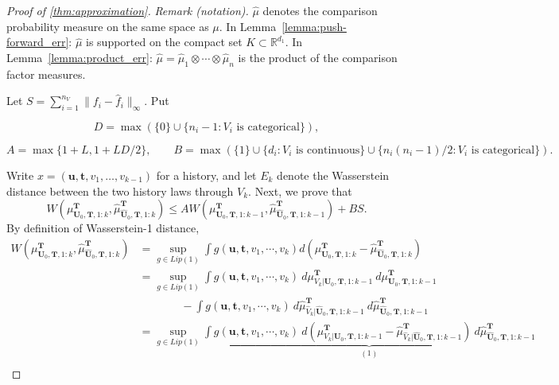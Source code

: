 \begin{proof}[Proof of \cref{thm:approximation}]
\noindent\textit{Remark (notation).} $\hat{\mu}$ denotes the comparison probability measure on the same space as $\mu$. In Lemma~\ref{lemma:push-forward_err}: $\hat{\mu}$ is supported on the compact set $K\subset\mathbb{R}^{d_1}$. In Lemma~\ref{lemma:product_err}: $\hat{\mu}=\hat{\mu}_1\otimes\cdots\otimes\hat{\mu}_n$ is the product of the comparison factor measures.

Let $S=\sum_{i=1}^{n_V}\|f_i-\hat f_i\|_\infty$. Put

\[
D=\max\left(\{0\}\cup\{n_i-1:V_i\text{ is categorical}\}\right),
\]

\[
A=\max\{1+L,1+LD/2\},\qquad
B=\max\left(\{1\}\cup\{d_i:V_i\text{ is continuous}\}\cup\{n_i(n_i-1)/2:V_i\text{ is categorical}\}\right).
\]

Write $x=(\boldsymbol u,\boldsymbol t,v_1,\ldots,v_{k-1})$ for a history, and let $E_k$ denote the Wasserstein distance between the two history laws through $V_k$. Next, we prove that
\begin{equation}\label{eq:approximation_middle_step}
W\left(\mu_{\boldsymbol U_0,\boldsymbol T,1:k}^{\boldsymbol T},\hat\mu_{\hat{\boldsymbol U}_0,\boldsymbol T,1:k}^{\boldsymbol T}\right)
\leqslant A W\left(\mu_{\boldsymbol U_0,\boldsymbol T,1:k-1}^{\boldsymbol T},\hat\mu_{\hat{\boldsymbol U}_0,\boldsymbol T,1:k-1}^{\boldsymbol T}\right)+BS.
\end{equation}
  By definition of Wasserstein-1 distance,
  \begin{align*}
  W\left( \mu _{\boldsymbol{U}_0 ,\boldsymbol{T} ,1:k}^{\boldsymbol{T}} ,\hat{\mu }_{\hat{\boldsymbol{U}}_0 ,\boldsymbol{T} ,1:k}^{\boldsymbol{T}}\right) & =\sup _{g\in Lip( 1)}\int g(\boldsymbol{u} ,\boldsymbol{t} ,v_{1} ,\cdots ,v_{k}) d\left( \mu _{\boldsymbol{U}_0 ,\boldsymbol{T} ,1:k}^{\boldsymbol{T}} -\hat{\mu }_{\hat{\boldsymbol{U}}_0 ,\boldsymbol{T} ,1:k}^{\boldsymbol{T}}\right)\\
   & =\sup _{g\in Lip( 1)}\int g(\boldsymbol{u} ,\boldsymbol{t} ,v_{1} ,\cdots ,v_{k}) \ d\mu _{V_{k} |\boldsymbol{U}_0 ,\boldsymbol{T} ,1:k-1}^{\boldsymbol{T}} \ d\mu _{{\boldsymbol{U}}_0 ,\boldsymbol{T} ,1:k-1}^{\boldsymbol{T}}\\
   & \ \ \ \ \ \ \ \ \ \ \ \ \ \ \ \ \ -\int g(\boldsymbol{u} ,\boldsymbol{t} ,v_{1} ,\cdots ,v_{k}) \ d\hat{\mu }_{\hat{V}_{k} |\hat{\boldsymbol{U}}_0 ,\boldsymbol{T} ,1:k-1}^{\boldsymbol{T}} \ d\hat{\mu }_{\hat{\boldsymbol{U}}_0 ,\boldsymbol{T} ,1:k-1}^{\boldsymbol{T}}\\
   & = \sup _{g\in Lip( 1)}\underbrace{\int g(\boldsymbol{u} ,\boldsymbol{t} ,v_{1} ,\cdots ,v_{k}) \ d\left( \mu _{V_{k} |\boldsymbol{U}_0 ,\boldsymbol{T} ,1:k-1}^{\boldsymbol{T}} -\hat{\mu }_{\hat{V}_{k} |\hat{\boldsymbol{U}}_0 ,\boldsymbol{T} ,1:k-1}^{\boldsymbol{T}}\right) \ d\hat{\mu }_{\hat{\boldsymbol{U}}_0 ,\boldsymbol{T} ,1:k-1}^{\boldsymbol{T}}}_{(1)}\\

\end{align*}
\end{proof}
